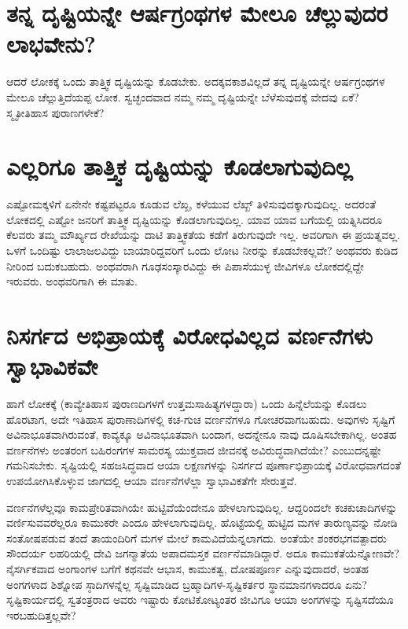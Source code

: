 \section*{ತನ್ನ ದೃಷ್ಟಿಯನ್ನೇ ಆರ್ಷಗ್ರಂಥಗಳ ಮೇಲೂ ಚೆಲ್ಲುವುದರ ಲಾಭವೇನು?}

ಆದರೆ ಲೋಕಕ್ಕೆ ಒಂದು ತಾತ್ತ್ವಿಕ ದೃಷ್ಟಿಯನ್ನು ಕೊಡಬೇಕು. ಅದಕ್ಕವಕಾಶವಿಲ್ಲದೆ ತನ್ನ ದೃಷ್ಟಿಯನ್ನೇ ಆರ್ಷಗ್ರಂಥಗಳ ಮೇಲೂ ಚೆಲ್ಲುತ್ತಿದೆಯಪ್ಪ ಲೋಕ. ಸ್ವಚ್ಛಂದವಾದ ನಮ್ಮ ನಮ್ಮ ದೃಷ್ಟಿಯನ್ನೇ ಬೆಳೆಸುವುದಕ್ಕೆ  ವೇದವು ಏಕೆ? ಸ್ಮೃತೀತಿಹಾಸ ಪುರಾಣಗಳೇಕೆ?

\section*{ಎಲ್ಲರಿಗೂ ತಾತ್ತ್ವಿಕ ದೃಷ್ಟಿಯನ್ನು ಕೊಡಲಾಗುವುದಿಲ್ಲ}

ಎಷ್ಟೋಮಕ್ಕಳಿಗೆ ಏನೇನೇ ಕಷ್ಟಪಟ್ಟರೂ ಕೂಡುವ ಲೆಖ್ಖ, ಕಳೆಯುವ ಲೆಖ್ಖ್ ತಿಳಿಸುವುದಕ್ಕಾಗುವುದಿಲ್ಲ. ಅದರಂತೆ ಲೋಕದಲ್ಲಿ ಎಷ್ಟೋ ಜನರಿಗೆ ತಾತ್ತ್ವಿಕ ದೃಷ್ಟಿಯನ್ನು ಕೊಡಲಾಗುವುದಿಲ್ಲ. ಯಾವ ಯಾವ ಬಗೆಯಲ್ಲಿ ಯತ್ನಿಸಿದರೂ ಕೆಲವರು ತಮ್ಮ ಮೌರ್ಖ್ಯದ ರೇಖೆಯನ್ನು ದಾಟಿ ತಾತ್ತ್ವಿಕತೆಯ ಕಡೆಗೆ ತಿರುಗುವುದೇ ಇಲ್ಲ. ಅವರಿಗಾಗಿ ಈ ಪ್ರಯತ್ನವಲ್ಲ. ಒಳಗೆ ಒಂದಿಷ್ಟು ಲಾಲಾಜಲವಿದ್ದು ಬಾಯಾರಿದ್ದವರಿಗೆ ಒಂದು ಲೋಟ ನೀರನ್ನು ಕೊಡಬೇಕಲ್ಲವೇ? ಅಂಥವರು ಕುಡಿದ ನೀರಿಂದ ಬದುಕಬಹುದು. ಅಂಥವರಾಗಿ ಗೂಢಸಂಸ್ಕಾರವಿದ್ದು ಈ ಪಿಪಾಸೆಯುಳ್ಳ ಜೀವಿಗಳೂ ಲೋಕದಲ್ಲಿದ್ದೇ ಇರುವರು. ಅಂಥವರಿಗಾಗಿ ಈ ಮಾತು.

\section*{ನಿಸರ್ಗದ ಅಭಿಪ್ರಾಯಕ್ಕೆ ವಿರೋಧವಿಲ್ಲದ ವರ್ಣನೆಗಳು ಸ್ವಾಭಾವಿಕವೇ}

ಹಾಗೆ ಲೋಕಕ್ಕೆ (ಕಾವ್ಯೇತಿಹಾಸ ಪುರಾಣದಿಗಳಗೆ ಉತ್ತಮಸಾಹಿತ್ಯಗಳದ್ದಾರಾ) ಒಂದು ಹಿನ್ನೆಲೆಯನ್ನು ಕೊಡಲು ಹೊರಟಾಗ, ಅದೇ ಇತಿಹಾಸ ಪುರಾಣಾದಿಗಳಲ್ಲಿ ಕಚ-ಗುಚ ವರ್ಣನೆಗಳೂ ಗೋಚರವಾಗಬಹುದು. ಅವುಗಳು ಸೃಷ್ಟಿಗೆ ಅವಿನಾಭೂತವಾಗಿರುವಂತೆ, ಕಾವ್ಯಕ್ಕೂ ಅವಿನಾಭೂತವಾಗಿ ಬಂದಾಗ, ಅದನ್ನೇನೂ ನಾವು ದೂಷಿಸಬೇಕಾಗಿಲ್ಲ. ಅಂತಹ ವರ್ಣನೆಗಳು ಅಂತರಂಗ ಬಹಿರಂಗಗಳ ಸಾಮರಸ್ಯ ಯುಕ್ತವಾದ ಜೀವನಕ್ಕೆ ಅವಿರುದ್ಧವಾಗಿದೆಯೇ? ಎಂಬುದನ್ನಷ್ಟೇ ಗಮನಿಸಬೇಕು. ಸೃಷ್ಟಿಯಲ್ಲಿ ಸಹಜಸಿದ್ಧವಾದ ಆಯಾ ಲಕ್ಷಣಗಳನ್ನು ನಿಸರ್ಗದ ಪೂರ್ಣಾಭಿಪ್ರಾಯಕ್ಕೆ  ವಿರೋಧವಾಗದಂತೆ ಉಪಯೋಗಿಸಿಕೊಳ್ಳುವ ಜಾಗದಲ್ಲಿ ಆಯಾ ವರ್ಣನೆಗಳೆಲ್ಲಾ ಸ್ವಾಭಾವಿಕತೆಗೇ ಸೇರುತ್ತವೆ.

ವರ್ಣನೆಗಳೆಲ್ಲವೂ ಕಾಮಪ್ರೇರಿತವಾಗಿಯೇ ಹುಟ್ಟಿವೆಯೆಂದೇನೂ ಹೇಳಲಾಗುವುದಿಲ್ಲ. ಆದ್ದರಿಂದಲೇ ಕಚಕುಚಾದಿಗಳನ್ನು ವರ್ಣಿಸುವವರೆಲ್ಲರೂ ಕಾಮುಕರೇ ಎಂದೂ ಹೇಳಲಾಗುವುದಿಲ್ಲ. ಹೊಟ್ಟೆಯಲ್ಲಿ ಹುಟ್ಟಿದ ಮಗಳ ತಾರುಣ್ಯವನ್ನು ನೋಡಿ ಸಂತೋಷಪಡುವ ತಂದೆ ತಾಯಂದಿರಿಗೆ ಮಗಳ ಮೇಲೆ ಕಾಮವಿದೆಯೆನ್ನಲಾಗದು. ಅಂತೆಯೇ ಶಂಕರಭಗವತ್ಪಾದರು ಸೌಂದರ್ಯ ಲಹರಿಯಲ್ಲಿ ದೇವಿ ಜಗನ್ಮಾತೆಯ ಅಪಾದಮಸ್ತಕ ವರ್ಣನೆಮಾಡಿದ್ದಾರೆ. ಅದೂ ಕಾಮುಕತೆಯೆನ್ನೋಣವೇ? ನೈಸರ್ಗಿಕವಾದ ಅಂಗಾಂಗಳ ಬಗೆಗೆ ಕಥನವೇ ಆಭಾಸ, ಕಾಮುಕತ್ವ, ದೋಷಪೂರ್ಣ ಎನ್ನುವುದಾದರೆ, ಅಂತಹ ಅಂಗಗಳಾದ ಶಿಶ್ನೋಪ ಸ್ಠಾದಿಗಳನ್ನೆಲ್ಲ ಸೃಷ್ಟಿಮಾಡಿದ ಬ್ರಹ್ಮಾದಿಗಳ-ಸೃಷ್ಟಿಕರ್ತರ ಸ್ಥಾನಮಾನಗಳಾದರೂ ಏನು? ಸೃಷ್ಟಿಕಾರ್ಯದಲ್ಲಿ ಸ್ವತಂತ್ರರಾದ ಅವರು ಇಷ್ಟಾರು ಕೋಟಿಕೋಟ್ಯಂತರ ಜೀವಿಗೂ ಆಯಾ ಅಂಗಗಳನ್ನು ಸೃಷ್ಟಿಸದೆಯೂ ಇರಬಹುದಿತ್ತಲ್ಲವೇ?


